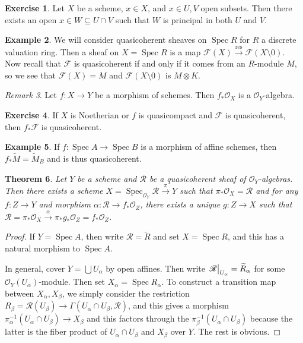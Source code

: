 \documentclass[leqno, openany]{memoir}
\newtheorem{thm}{Theorem}[section]
\theoremstyle{definition}
\newtheorem{exm}[thm]{Example}
\newtheorem{exer}[thm]{Exercise}
\theoremstyle{remark}
\newtheorem{rmk}[thm]{Remark}
\theoremstyle{plain}
\theoremstyle{definition}
\theoremstyle{remark}
\newcommand{\mr}[1]{\mathrm{#1}}
\newcommand{\msc}[1]{\mathscr{#1}}
\newcommand{\wt}[1]{\widetilde{#1}}
\DeclareMathOperator{\Spec}{Spec}
\begin{document}
\begin{exer}
    Let $X$ be a scheme, $x \in X$, and $x \in U,V$ open subsets. Then there exists an open $x \in W \subseteq U \cap V$ such that $W$ is principal in both $U$ and $V$.
\end{exer}

\begin{exm}
    We will consider quasicoherent sheaves on $\Spec R$ for $R$ a discrete valuation ring. Then a sheaf on $X = \Spec R$ is a map $\msc{F}(X) \xrightarrow{\mr{res}} \msc{F}(X \setminus \qty{0})$. Now recall that $\msc{F}$ is quasicoherent if and only if it comes from an $R$-module $M$, so we see that $\msc{F}(X) = M$ and $\msc{F}(X \setminus \qty{0})$ is $M \otimes K$.
\end{exm}

\begin{rmk}
    Let $f \colon X \to Y$ be a morphism of schemes. Then $f_* \msc{O}_X$ is a $\msc{O}_Y$-algebra.
\end{rmk}

\begin{exer}
    If $X$ is Noetherian or $f$ is quasicompact and $\msc{F}$ is quasicoherent, then $f_* \msc{F}$ is quasicoherent.
\end{exer}

\begin{exm}
    If $f \colon \Spec A \to \Spec B$ is a morphism of affine schemes, then $f_* \wt{M} = \wt{M}_B$ and is thus quasicoherent.
\end{exm}

\begin{thm}
    Let $Y$ be a scheme and $\msc{R}$ be a quasicoherent sheaf of $\msc{O}_Y$-algebras. Then there exists a scheme $X = \Spec_{\msc{O}_Y} \msc{R} \xrightarrow{\pi} Y$ such that $\pi_* \msc{O}_X = \msc{R}$ and for any $f \colon Z \to Y$ and morphism $\alpha \colon \msc{R} \to f_* \msc{O}_Z$, there exists a unique $g \colon Z \to X$ such that $\msc{R} = \pi_* \msc{O}_X \xrightarrow{\alpha} \pi_* g_* \msc{O}_Z = f_* \msc{O}_Z$.
\end{thm}

\begin{proof}
    If $Y = \Spec A$, then write $\msc{R} = \wt{R}$ and set $X = \Spec R$, and this has a natural morphism to $\Spec A$.

    In general, cover $Y = \bigcup U_{\alpha}$ by open affines. Then write $\eval{\msc{R}}_{U_{\alpha}} = \wt{R}_{\alpha}$ for some $\msc{O}_Y(U_{\alpha})$-module. Then set $X_{\alpha} = \Spec R_{\alpha}$. To construct a transition map between $X_{\alpha}, X_{\beta}$, we simply consider the restriction $R_{\beta} = \msc{R}(U_{\beta}) \to \Gamma(U_{\alpha} \cap U_{\beta}, \msc{R})$, and this gives a morphism $\pi_{\alpha}^{-1}(U_{\alpha} \cap U_{\beta}) \to X_{\beta}$ and this factors through the $\pi_{\beta}^{-1}(U_{\alpha} \cap U_{\beta})$ because the latter is the fiber product of $U_{\alpha} \cap U_{\beta}$ and $X_{\beta}$ over $Y$. The rest is obvious.
\end{proof}
\end{document}
